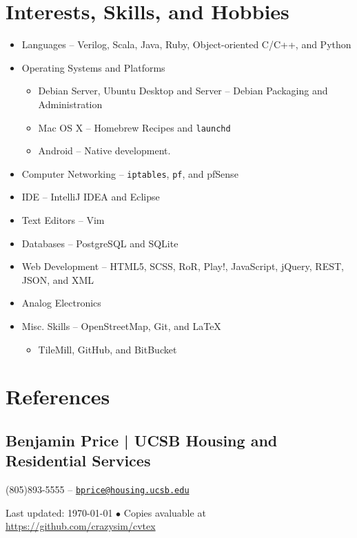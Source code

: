 \documentclass[10pt, letter]{article}
\newcommand{\reference}[4]{
\subsection*{#1 | {\footnotesize{#2}}}
#3 -- \href{mailto:#4}{\texttt{#4}}
}
\begin{document}
\begin{multicols}{2}
\section*{Interests, Skills, and Hobbies}

\begin{itemize}
    \item Languages -- Verilog, Scala, Java, Ruby, Object-oriented C/C++, and Python
    \item Operating Systems and Platforms
        \begin{itemize}
            \item Debian Server, Ubuntu Desktop and Server -- Debian Packaging and Administration
            \item Mac OS X -- Homebrew Recipes and \texttt{launchd}
            \item Android -- Native development.
        \end{itemize}
    \item Computer Networking -- \texttt{iptables}, \texttt{pf}, and pfSense
    \item IDE -- IntelliJ IDEA and Eclipse
    \item Text Editors -- Vim
    \item Databases -- PostgreSQL and SQLite
    \item Web Development -- HTML5, SCSS, RoR, Play!, JavaScript, jQuery, REST, JSON, and XML
    \item Analog Electronics 
    \item Misc. Skills -- OpenStreetMap, Git, and \LaTeX
        \begin{itemize}
            \item TileMill, GitHub, and BitBucket
        \end{itemize}
\end{itemize}

\section*{References}

\reference{Benjamin Price}{UCSB Housing and Residential Services}
{(805)893-5555}{bprice@housing.ucsb.edu}





\end{multicols}

\begin{center}
{\scriptsize  Last updated: \today\- $\bullet$\- 
Copies avaluable at \href{https://github.com/crazysim/cvtex}{https://github.com/crazysim/cvtex}}
\end{center}
\end{document}

